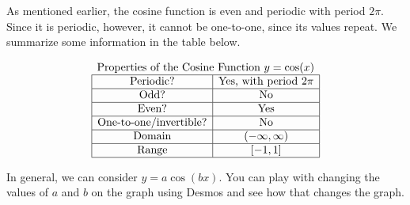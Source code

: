 \documentclass[nooutcomes]{ximera}
\begin{document}
As mentioned earlier, the cosine function is even and periodic with period $2\pi$. Since it is periodic, however, it cannot be one-to-one, since its values repeat. We summarize some information in the table below.

\[
\begin{array}{ c }
 \text{\normalfont Properties of the Cosine Function } y=\cos(x) \\
\begin{array}{|c|c|}
 \hline
\text{Periodic?} & \text{Yes, with period }2\pi \\ \hline
\text{Odd?} & \text{No} \\ \hline
\text{Even?} & \text{Yes} \\ \hline
\text{One-to-one/invertible?} & \text{No} \\ \hline
\text{Domain} & (-\infty,\infty)\\ \hline
\text{Range} & [-1,1]\\ \hline
\end{array}
\end{array}
\]

In general, we can consider $y=a\cos(bx)$.  You can play with changing the values of $a$ and $b$ on the graph using Desmos and see how that changes the graph.  

\begin{center}  
\end{center}
\end{document}

